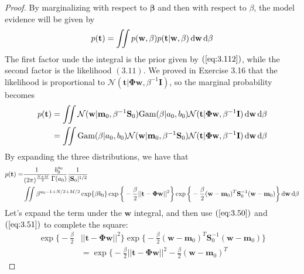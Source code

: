 \begin{proof}
    By marginalizing with respect to $\mathbf{\beta}$ and then
    with respect to $\beta$, the model evidence will be given by
     \[
         p(\mathbf{t}) 
         = \iint p(\mathbf{w}, \beta) p(\mathbf{t} | \mathbf{w}, \beta) \mathop{}\!\mathrm{d} \mathbf{w} 
         \mathop{}\!\mathrm{d}\beta
    \] 
    The first factor unde the integral is the prior given by $(\ref{eq:3.112})$,
    while the second factor is the likelihood $(3.11)$. We proved
    in Exercise 3.16 that the likelihood is proportional to 
    $\mathcal{N}(\mathbf{t} | \mathbf{\Phi}\mathbf{w}, \beta^{-1}\mathbf{I})$,
    so the marginal probability becomes
    \begin{align*}
         p(\mathbf{t}) 
         &= \iint \mathcal{N}(\mathbf{w} | \mathbf{m}_0, \beta^{-1}\mathbf{S}_0)
            \text{Gam}(\beta | a_0, b_0) 
            \mathcal{N}(\mathbf{t} | \mathbf{\Phi}\mathbf{w}, \beta^{-1}\mathbf{I}) 
            \mathop{}\!\mathrm{d} \mathbf{w}\mathop{}\!\mathrm{d}\beta \\
         &= \iint \text{Gam}(\beta | a_0, b_0)
            \mathcal{N}(\mathbf{w} | \mathbf{m}_0, \beta^{-1}\mathbf{S}_0)
            \mathcal{N}(\mathbf{t} | \mathbf{\Phi}\mathbf{w}, 
                \beta^{-1}\mathbf{I}) \mathop{}\!\mathrm{d} \mathbf{w}
            \mathop{}\!\mathrm{d} \beta
    \end{align*}
    By expanding the three distributions, we have that
    \begin{align*}
        p(\mathbf{t}) = &\frac{1}{(2\pi)^{\frac{N + M}{2}}}\frac{b_0^{a_0}}{\Gamma(a_0)}
         \frac{1}{|\mathbf{S}_0|^{1/2}} \\
        &\iint \beta^{a_0 - 1 + N/2 + M/2} \exp\{\beta b_0\}
         \exp\bigg\{-\frac{\beta}{2} ||\mathbf{t} - \mathbf{\Phi}\mathbf{w}||^2\bigg\}
         \exp\bigg\{-\frac{\beta}{2}(\mathbf{w} - \mathbf{m}_0)^T
             \mathbf{S}_0^{-1}(\mathbf{w} - \mathbf{m}_0)
         \bigg\} \mathop{}\!\mathrm{d} \mathbf{w} \mathop{}\!\mathrm{d} \beta
    \end{align*}
    Let's expand the term under the $\mathbf{w}$ integral, and then use $(\ref{eq:3.50})$ and
    $(\ref{eq:3.51})$ to complete the square:
    \begin{align*}
        \exp\bigg\{-\frac{\beta}{2} &||\mathbf{t} - \mathbf{\Phi}\mathbf{w}||^2\bigg\}
        \exp\bigg\{-\frac{\beta}{2}(\mathbf{w} - \mathbf{m}_0)^T
             \mathbf{S}_0^{-1}(\mathbf{w} - \mathbf{m}_0)
         \bigg\} \\
        &=\exp\bigg\{-\frac{\beta}{2} ||\mathbf{t} - \mathbf{\Phi}\mathbf{w}||^2
        -\frac{\beta}{2}(\mathbf{w} - \mathbf{m}_0)^T

\end{align*}
\end{proof}
